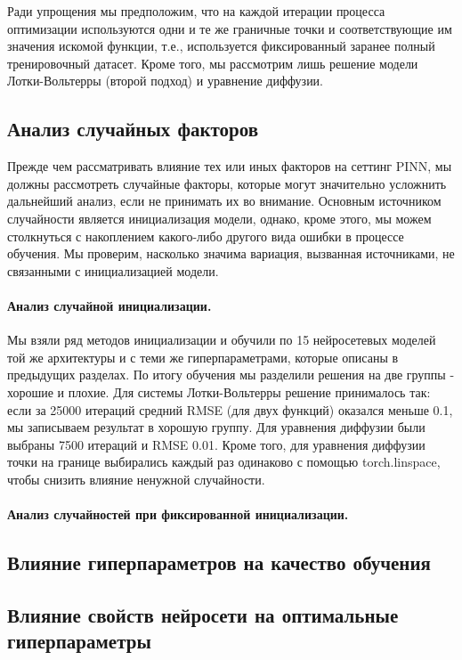 \documentclass[a4paper, 12pt]{article}
\begin{document}
Ради упрощения мы предположим, что на каждой итерации процесса оптимизации используются одни и те же граничные точки и соответствующие им значения искомой функции, т.е., используется фиксированный заранее полный тренировочный датасет. Кроме того, мы рассмотрим лишь решение модели Лотки-Вольтерры (второй подход) и уравнение диффузии.

\subsection{Анализ случайных факторов}

Прежде чем рассматривать влияние тех или иных факторов на сеттинг PINN, мы должны рассмотреть случайные факторы, которые могут значительно усложнить дальнейший анализ, если не принимать их во внимание. Основным источником случайности является инициализация модели, однако, кроме этого, мы можем столкнуться с накоплением какого-либо другого вида ошибки в процессе обучения. Мы проверим, насколько значима вариация, вызванная источниками, не связанными с инициализацией модели.

\paragraph{Анализ случайной инициализации.} Мы взяли ряд методов инициализации и обучили по 15 нейросетевых моделей той же архитектуры и с теми же гиперпараметрами, которые описаны в предыдущих разделах. По итогу обучения мы разделили решения на две группы - хорошие и плохие. Для системы Лотки-Вольтерры решение принималось так: если за 25000 итераций средний RMSE (для двух функций) оказался меньше 0.1, мы записываем результат в хорошую группу. Для уравнения диффузии были выбраны 7500 итераций и RMSE 0.01. Кроме того, для уравнения диффузии точки на границе выбирались каждый раз одинаково с помощью torch.linspace, чтобы снизить влияние ненужной случайности.

\paragraph{Анализ случайностей при фиксированной инициализации.}

\subsection{Влияние гиперпараметров на качество обучения}

\subsection{Влияние свойств нейросети на оптимальные гиперпараметры}
\end{document}
